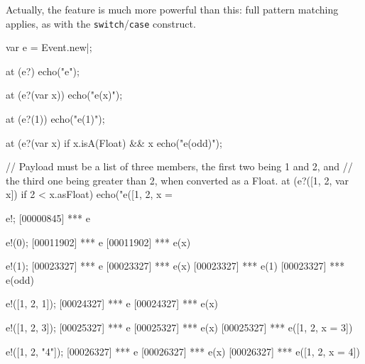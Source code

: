 Actually, the feature is much more powerful than this: full pattern matching
applies, as with the \lstinline|switch|/\lstinline|case| construct.

\begin{urbiscript}
var e = Event.new|;

at (e?)
  echo("e");

at (e?(var x))
  echo("e(x)");

at (e?(1))
  echo("e(1)");

at (e?(var x) if x.isA(Float) && x %
  echo("e(odd)");

// Payload must be a list of three members, the first two being 1 and 2, and
// the third one being greater than 2, when converted as a Float.
at (e?([1, 2, var x]) if 2 < x.asFloat)
  echo("e([1, 2, x = %

e!;
[00000845] *** e

e!(0);
[00011902] *** e
[00011902] *** e(x)

e!(1);
[00023327] *** e
[00023327] *** e(x)
[00023327] *** e(1)
[00023327] *** e(odd)

e!([1, 2, 1]);
[00024327] *** e
[00024327] *** e(x)

e!([1, 2, 3]);
[00025327] *** e
[00025327] *** e(x)
[00025327] *** e([1, 2, x = 3])

e!([1, 2, "4"]);
[00026327] *** e
[00026327] *** e(x)
[00026327] *** e([1, 2, x = 4])
\end{urbiscript}

